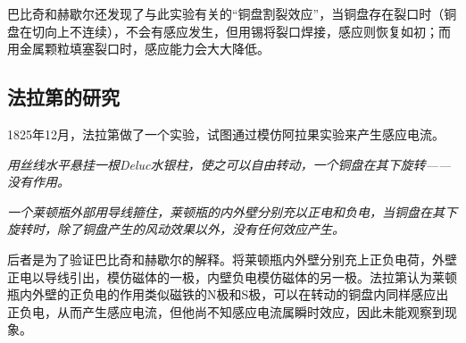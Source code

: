 \documentclass{CLGPY}
\begin{document}
\begin{multicols}{1}
巴比奇和赫歇尔还发现了与此实验有关的“铜盘割裂效应”，当铜盘存在裂口时（铜盘在切向上不连续），不会有感应发生，但用锡将裂口焊接，感应则恢复如初；而用金属颗粒填塞裂口时，感应能力会大大降低。




        \subsection{法拉第的研究}
       1825年12月，法拉第做了一个实验，试图通过模仿阿拉果实验来产生感应电流。

        \emph{用丝线水平悬挂一根Deluc水银柱，使之可以自由转动，一个铜盘在其下旋转——没有作用。}

        \emph{一个莱顿瓶外部用导线箍住，莱顿瓶的内外壁分别充以正电和负电，当铜盘在其下旋转时，除了铜盘产生的风动效果以外，没有任何效应产生。}
       
后者是为了验证巴比奇和赫歇尔的解释。将莱顿瓶内外壁分别充上正负电荷，外壁正电以导线引出，模仿磁体的一极，内壁负电模仿磁体的另一极。法拉第认为莱顿瓶内外壁的正负电的作用类似磁铁的N极和S极，可以在转动的铜盘内同样感应出正负电，从而产生感应电流，但他尚不知感应电流属瞬时效应，因此未能观察到现象。


\end{multicols}
\end{document}
